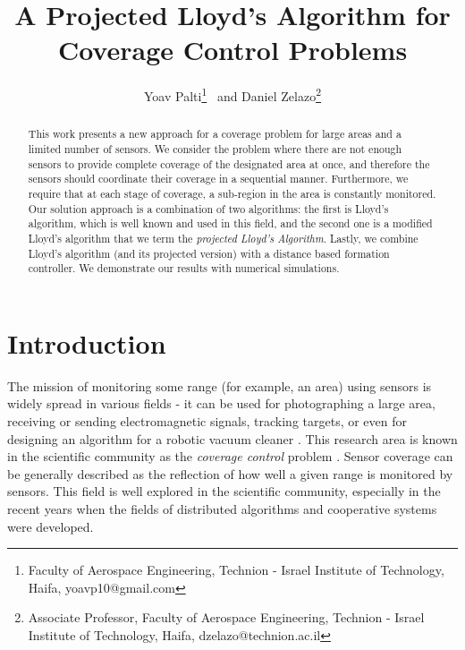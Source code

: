 \documentclass{iacas}
\begin{document}

\title{A Projected Lloyd's Algorithm for Coverage Control Problems}

\author{%
  Yoav Palti\thanks{Faculty of Aerospace Engineering, Technion - Israel Institute of Technology, Haifa, yoavp10@gmail.com}
  \ and
  Daniel Zelazo\thanks{Associate Professor, Faculty of Aerospace Engineering, Technion - Israel Institute of Technology, Haifa, dzelazo@technion.ac.il}
}

\maketitle

\begin{abstract}
This work presents a new approach for a coverage problem for large areas and a limited number of sensors. We consider the problem where there are not enough sensors to provide complete coverage of the designated area at once, and therefore the sensors should coordinate their coverage in a sequential manner.  Furthermore, we require that at each stage of coverage, a sub-region in the area is constantly monitored. Our solution approach is a combination of two algorithms: the first is Lloyd's algorithm, which is well known and used in this field, and the second one is a modified Lloyd's algorithm that we term the \emph{projected Lloyd's Algorithm}. Lastly, we combine Lloyd's algorithm (and its projected version) with a distance based formation controller. We demonstrate our results with numerical simulations.
\end{abstract}

\section{Introduction}

The mission of monitoring some range (for example, an area) using sensors is widely spread in various fields - it can be used for photographing a large area, receiving or sending electromagnetic signals, tracking targets, or even for designing an algorithm for a robotic vacuum cleaner \cite{Nigam2012, 7798796, 7798244}.
%
This research area is known in the scientific community as the \emph{coverage control} problem \cite{Cassandras2005}. Sensor coverage can be generally described as the reflection of how well a given range is monitored by sensors. This field is well explored in the scientific community, especially in the recent years when the fields of distributed algorithms and cooperative systems were developed.
\end{document}
